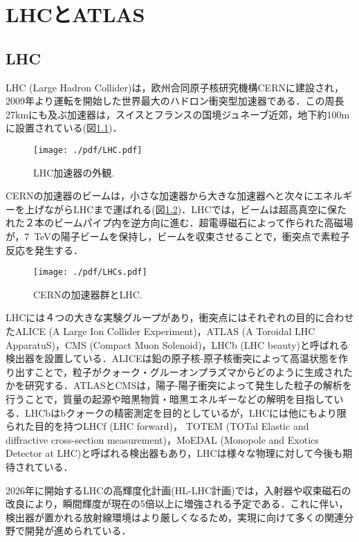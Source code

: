 \chapter{LHCとATLAS}
\label{chap:start}
\section{LHC}
LHC (Large Hadron Collider)は，欧州合同原子核研究機構CERNに建設され，2009年より運転を開始した世界最大のハドロン衝突型加速器である．この周長27kmにも及ぶ加速器は，スイスとフランスの国境ジュネーブ近郊，地下約100mに設置されている(図\ref{fig:LHC})．\par
\begin{figure}[h]
	\centering
	\texttt{[image: ./pdf/LHC.pdf]}
	\caption{LHC加速器の外観\cite{cern}.}
	\label{fig:LHC}
\end{figure}
CERNの加速器のビームは，小さな加速器から大きな加速器へと次々にエネルギーを上げながらLHCまで運ばれる(図\ref{fig:LHCs})．LHCでは，ビームは超高真空に保たれた２本のビームパイプ内を逆方向に進む．超電導磁石によって作られた高磁場が，7~TeVの陽子ビームを保持し，ビームを収束させることで，衝突点で素粒子反応を発生する．\par
\begin{figure}[h]
	\centering
	\texttt{[image: ./pdf/LHCs.pdf]}
	\caption{CERNの加速器群とLHC\cite{cern}.}
	\label{fig:LHCs}
\end{figure}
LHCには４つの大きな実験グループがあり，衝突点にはそれぞれの目的に合わせたALICE (A Large Ion Collider Experiment)，ATLAS (A Toroidal LHC ApparatuS)，CMS (Compact Muon Solenoid)，LHCb (LHC beauty)と呼ばれる検出器を設置している．ALICEは鉛の原子核-原子核衝突によって高温状態を作り出すことで，粒子がクォーク・グルーオンプラズマからどのように生成されたかを研究する．ATLASとCMSは，陽子-陽子衝突によって発生した粒子の解析を行うことで，質量の起源や暗黒物質・暗黒エネルギーなどの解明を目指している．LHCbはbクォークの精密測定を目的としているが，LHCには他にもより限られた目的を持つLHCf (LHC forward)，
TOTEM (TOTal Elastic and diffractive cross-section measurement)，MoEDAL (Monopole and Exotics Detector at LHC)と呼ばれる検出器もあり，LHCは様々な物理に対して今後も期待されている．\par
2026年に開始するLHCの高輝度化計画(HL-LHC計画)では，入射器や収束磁石の改良により，瞬間輝度が現在の5倍以上に増強される予定である．これに伴い，検出器が置かれる放射線環境はより厳しくなるため，実現に向けて多くの関連分野で開発が進められている．
